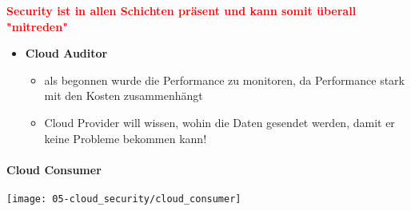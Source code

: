 \textcolor{red}{\textbf{Security ist in allen Schichten präsent und kann somit überall "mitreden"}}\\

\begin{itemize}
    \item \textbf{Cloud Auditor}
    \begin{itemize}
        \item als begonnen wurde die Performance zu monitoren, da Performance stark mit den Kosten zusammenhängt
        \item Cloud Provider will wissen, wohin die Daten gesendet werden, damit er keine Probleme bekommen kann!
    \end{itemize}
\end{itemize}

\paragraph{Cloud Consumer}
\begin{center}
    \texttt{[image: 05-cloud\_security/cloud\_consumer]}
    \vspace{-8pt}
\end{center}

\newpage

